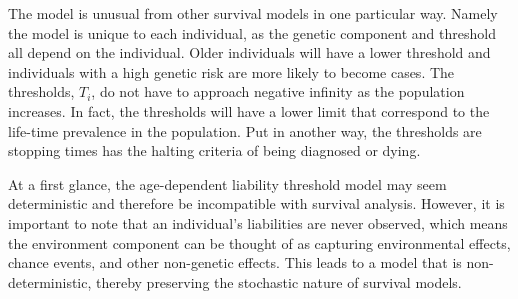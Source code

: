 The model is unusual from other survival models in one particular way. Namely the model is unique to each individual, as the genetic component and threshold all depend on the individual. Older individuals will have a lower threshold and individuals with a high genetic risk are more likely to become cases. The thresholds, $ T_i $, do not have to approach negative infinity as the population increases. In fact, the thresholds will have a lower limit that correspond to the life-time prevalence in the population. Put in another way, the thresholds are stopping times has the halting criteria of being diagnosed or dying.


At a first glance, the age-dependent liability threshold model may seem deterministic and therefore be incompatible with survival analysis. However, it is important to note that an individual's liabilities are never observed, which means the environment component can be thought of as capturing environmental effects, chance events, and other non-genetic effects. This leads to a model that is non-deterministic, thereby preserving the stochastic nature of survival models.
